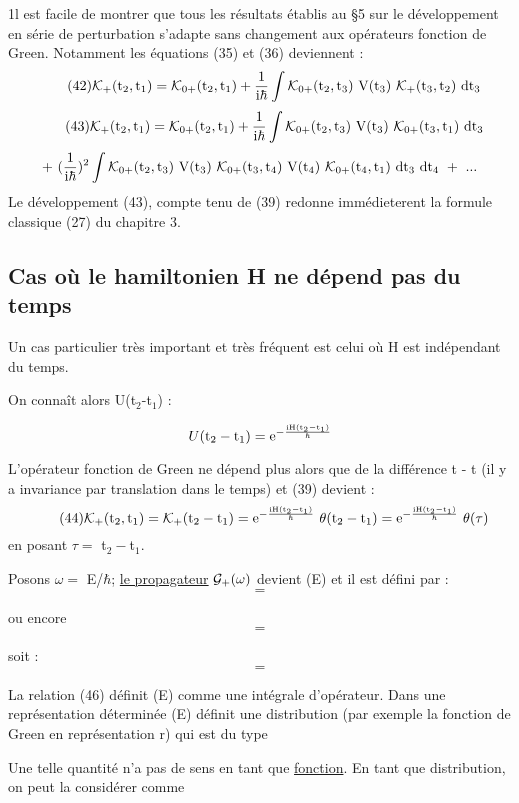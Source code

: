 1l est facile de montrer que tous les résultats établis au \S 5 sur le
développement en série de perturbation s'adapte sans changement aux opérateurs
fonction de Green. Notamment les équations (35) et (36) deviennent :
\[
\tag{42}\mc{K}_+(\mt{t}_2,\mt{t}_1)=\mc{K}_{0+}(\mt{t}_2,\mt{t}_1) + \frac{1}{\mt{i}\hbar}\int
\mc{K}_{0+}(\mt{t}_2,\mt{t}_3)\ \mt{V}(\mt{t}_3)\ \mc{K}_+(\mt{t}_3,\mt{t}_2)\ \mt{dt}_3
\]
\[
\tag{43}\mc{K}_+(\mt{t}_2,\mt{t}_1)=\mc{K}_{0+}(\mt{t}_2,\mt{t}_1) + \frac{1}{\mt{i}\hbar}\int
\mc{K}_{0+}(\mt{t}_2,\mt{t}_3)\ \mt{V}(\mt{t}_3)\ \mc{K}_{0+}(\mt{t}_3,\mt{t}_1)\ \mt{dt}_3
\]
\[
+\ (\frac{1}{\mt{i}\hbar})^2\int\mc{K}_{0+}(\mt{t}_2,\mt{t}_3)\ \mt{V}(\mt{t}_3)\ \mc{K}_{0+}(\mt{t}_3,\mt{t}_4)\ \mt{V}(\mt{t}_4)\ \mc{K}_{0+}(\mt{t}_4,\mt{t}_1)\ \mt{dt}_3\ \mt{dt}_4\ +\ ...
\]
Le développement (43), compte tenu de (39) redonne immédieterent la formule
classique (27) du chapitre 3.

\subsection{Cas où le hamiltonien H ne dépend pas du temps}%

Un cas particulier très important et très fréquent est celui où
H est indépendant du temps.

On connaît alors U(t$_2$-t$_1$) :

\[
U(\text{t}_2-\text{t}_1)=\text{e}^{-\frac{\text{iH}(\text{t}_2-\text{t}_1)}{\hbar}}
\]

L'opérateur fonction de Green ne dépend plus alors que de la différence
t - t (il y a invariance par translation dans le temps) et (39) devient :
\[
\tag{44}\mc{K}_+(\mt{t}_2,\mt{t}_1)=\mc{K}_+(\mt{t}_2-\mt{t}_1)=\mt{e}^{-\frac{\mt{iH}(\mt{t}_2-\mt{t}_1)}{\hbar}}\ \theta(\mt{t}_2-\mt{t}_1)
=\mt{e}^{-\frac{\mt{iH}(\mt{t}_2-\mt{t}_1)}{\hbar}}\ \theta(\tau)
\]
en posant $\tau=$ t$_2-$t$_1$.

Posons $\omega=$ E/$\hbar$; \ul{le propagateur} $\mathcal{G}_+(\omega)$ devient (E) et il est défini
par :
\[
\tag{45}=
\]


ou encore
\[
=
\]

soit :
\[
\tag{46}=
\]

La relation (46) définit (E) comme une intégrale d'opérateur. Dans
une représentation déterminée (E) définit une distribution (par
exemple la fonction de Green en représentation r) qui est du type

Une telle quantité n'a pas de sens en tant que \ul{fonction}. En tant que distribution, on peut la considérer comme

